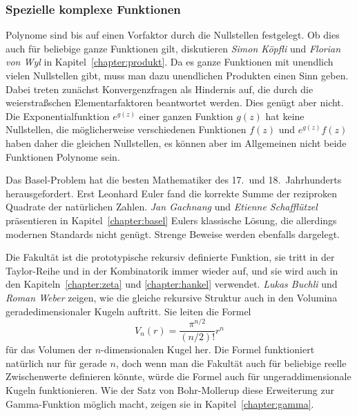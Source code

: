 %
%
\subsubsection{Spezielle komplexe Funktionen}

%
%
Polynome sind bis auf einen Vorfaktor durch die Nullstellen
festgelegt.
Ob dies auch für beliebige ganze Funktionen gilt, diskutieren
\emph{Simon Köpfli}
%
%
und
\emph{Florian von Wyl}
%
%
in Kapitel~\ref{chapter:produkt}.
Da es ganze Funktionen mit unendlich vielen Nullstellen gibt, muss
man dazu unendlichen Produkten einen Sinn geben.
%
Dabei treten zunächst Konvergenzfragen als Hindernis auf, die durch
die weierstraßschen Elementarfaktoren beantwortet werden.
Dies genügt aber nicht.
Die Exponentialfunktion $e^{g(z)}$ einer ganzen Funktion $g(z)$ hat
keine Nullstellen, die möglicherweise verschiedenen Funktionen $f(z)$
und $e^{g(z)}f(z)$ haben daher die gleichen Nullstellen, es können
aber im Allgemeinen nicht beide Funktionen Polynome sein.

%
%
Das Basel-Problem hat die besten Mathematiker des 17.~und 18.~Jahrhunderts
herausgefordert.
%
Erst Leonhard Euler fand die korrekte Summe der reziproken Quadrate der
%
natürlichen Zahlen.
\emph{Jan Gachnang}
und
\emph{Etienne Schafflützel}
präsentieren in Kapitel~\ref{chapter:basel} Eulers klassische Lösung,
die allerdings modernen Standards nicht genügt.
Strenge Beweise werden ebenfalls dargelegt.

%
%
Die Fakultät ist die prototypische rekursiv definierte Funktion, sie
tritt in der Taylor-Reihe und in der Kombinatorik immer wieder auf,
und sie wird auch in den Kapiteln~\ref{chapter:zeta} und \ref{chapter:hankel}
verwendet.
\emph{Lukas Buchli}
%
%
und
\emph{Roman Weber}
%
%
zeigen, wie die gleiche rekursive Struktur auch in den Volumina 
geradedimensionaler Kugeln auftritt.
Sie leiten die Formel
\[
V_n(r)
=
\frac{\pi^{n/2}}{(n/2)!}r^n
\]
für das Volumen der $n$-dimensionalen Kugel her.
Die Formel funktioniert natürlich nur für gerade $n$, doch wenn man
die Fakultät auch für beliebige reelle Zwischenwerte definieren könnte,
würde die Formel auch für ungeraddimensionale Kugeln funktionieren.
Wie der Satz von Bohr-Mollerup diese Erweiterung zur Gamma-Funktion
%
möglich macht, zeigen sie in Kapitel~\ref{chapter:gamma}.

